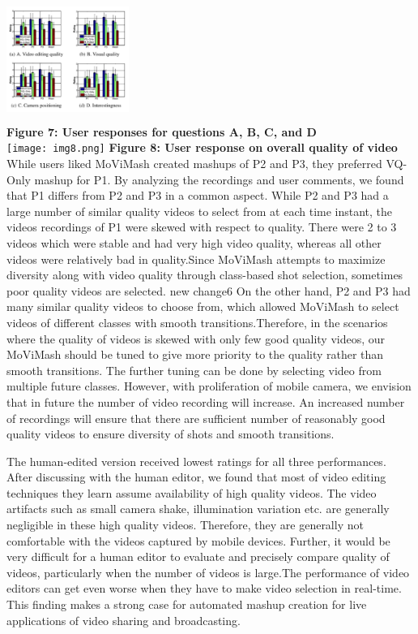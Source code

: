 \documentclass{sig-alternate}
\begin{document}
\includegraphics[width=4cm, height=4cm]{img7.png}\\
\textbf{Figure 7: User responses for questions A, B, C, and D}\\
\texttt{[image: img8.png]}
\textbf{Figure 8: User response on overall quality of video}
While users liked MoViMash created mashups of P2 and P3, they preferred VQ-Only mashup for P1. By analyzing the recordings and user comments, we found that P1 differs from P2 and P3 in a common aspect. While P2 and P3 had a large number of similar quality videos to select from at each time instant, the videos recordings of P1 were skewed with respect to quality. There were 2 to 3 videos which were stable and had very high video quality, whereas all other videos were relatively bad in quality.Since MoViMash attempts to maximize diversity along with video quality through class-based shot selection, sometimes poor quality videos are selected.
new change6
On the other hand, P2 and P3 had many similar quality videos to choose from, which allowed MoViMash to select videos of different classes with smooth transitions.Therefore, in the scenarios where the quality of videos is skewed with only few good quality videos, our MoViMash should be tuned to give more priority to
the quality rather than smooth transitions. The further tuning can be done by selecting video from multiple future classes. However, with proliferation of mobile camera, we envision that in future the number of video recording will increase. An increased number of recordings will ensure that there are sufficient number of reasonably good quality videos to ensure diversity of shots and smooth transitions.

The human-edited version received lowest ratings for all three performances. After discussing with the human editor, we found that most of video editing techniques they learn assume availability of high quality videos. The video artifacts such as small camera shake, illumination variation etc. are generally negligible in these high quality videos. Therefore, they are generally not comfortable with the videos captured by mobile devices. Further, it would be very difficult for a human editor to evaluate and precisely compare quality of videos, particularly when the number of videos is large.The performance of video editors can get even worse when they have to make video selection in real-time. This finding makes a strong case for automated mashup creation for live applications of video sharing and broadcasting.
\end{document}
